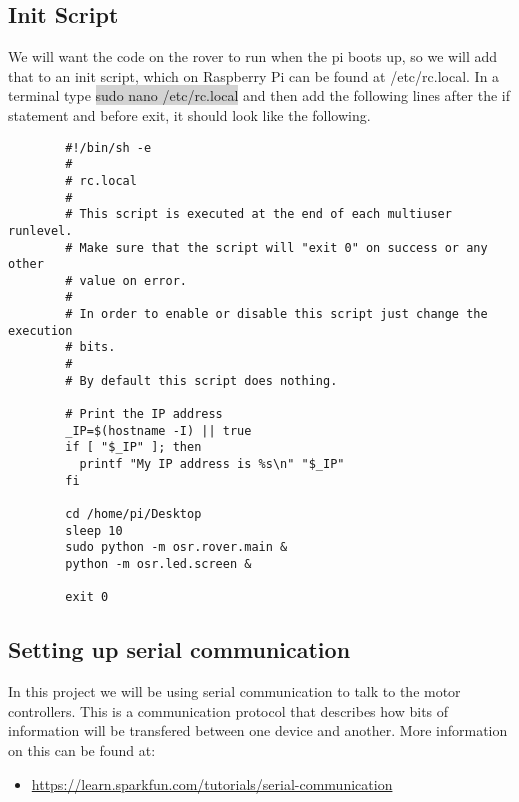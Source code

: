 \documentclass[12pt]{article}
\begin{document}
\subsection{Init Script}
We will want the code on the rover to run when the pi boots up, so we will add that to an init script, which on Raspberry Pi can be found at /etc/rc.local. In a terminal type \colorbox{lightgray}{sudo nano /etc/rc.local} and then add the following lines after the if statement and before exit, it should look like the following.
\begin{verbatim}
		#!/bin/sh -e
		#
		# rc.local
		#
		# This script is executed at the end of each multiuser runlevel.
		# Make sure that the script will "exit 0" on success or any other
		# value on error.
		#
		# In order to enable or disable this script just change the execution
		# bits.
		#
		# By default this script does nothing.
		
		# Print the IP address
		_IP=$(hostname -I) || true
		if [ "$_IP" ]; then
		  printf "My IP address is %s\n" "$_IP"
		fi
		
		cd /home/pi/Desktop
		sleep 10
		sudo python -m osr.rover.main &
		python -m osr.led.screen &
		
		exit 0

\end{verbatim}

\subsection{Setting up serial communication}	

In this project we will be using serial communication to talk to the motor controllers. This is a communication protocol that describes how bits of information will be transfered between one device and another. More information on this can be found at:
\begin{itemize}
	\item \href{https://learn.sparkfun.com/tutorials/serial-communication}{https://learn.sparkfun.com/tutorials/serial-communication}
\end{itemize}
\end{document}
